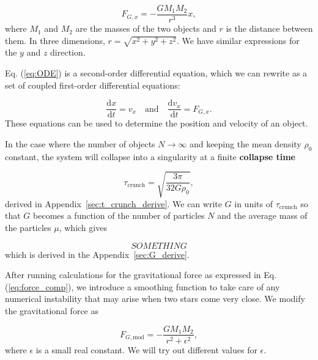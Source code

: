 \documentclass{article}
\begin{document}
\begin{multicols}{2}
\begin{equation}\label{eq:force_comp}
	F_{G,x} = - \frac{G M_1 M_2}{r^3}x,
\end{equation}
where $M_1$ and $M_2$ are the masses of the two objects and $r$ is the distance between them. In three dimensions, $r = \sqrt{x^2 + y^2 + z^2}$. We have similar expressions for the $y$ and $z$ direction.

Eq. (\ref{eq:ODE}) is a second-order differential equation, which we can rewrite as a set of coupled first-order differential equations:

\begin{equation}
	\frac{\mathrm{d}x}{\mathrm{d}t} = v_x  \quad \mathrm{and} \quad \frac{\mathrm{d}v_x}{\mathrm{d}t} = F_{G,x}.
\end{equation}
These equations can be used to determine the position and velocity of an object.


In the case where the number of objects $N \rightarrow \infty$ and keeping the mean density $\rho_0$ constant, the system will collapse into a singularity at a finite \textbf{collapse time} 

\begin{equation}\label{eq:t_crunch}
\tau_{\mathrm{crunch}} = \sqrt{\frac{3 \pi}{32G\rho_0}},
\end{equation} 
derived in Appendix~\ref{sec:t_crunch_derive}. We can write $G$ in units of $\tau_{\mathrm{crunch}}$ so that $G$ becomes a function of the number of particles $N$ and the average mass of the particles $\mu$, which gives

\begin{equation}
	SOMETHING
\end{equation}
which is derived in the Appendix~\ref{sec:G_derive}.

After running calculations for the gravitational force as expressed in Eq. (\ref{eq:force_comp}), we introduce a smoothing function to take care of any numerical instability that may arise when two stars come very close. We modify the gravitational force as

\begin{equation}\label{eq:force_mod}
	F_{G,\mathrm{mod}} = - \frac{G M_1 M_2}{r^2 + \epsilon^2},
\end{equation}
where $\epsilon$ is a small real constant. We will try out different values for $\epsilon$.


\end{multicols}
\end{document}
